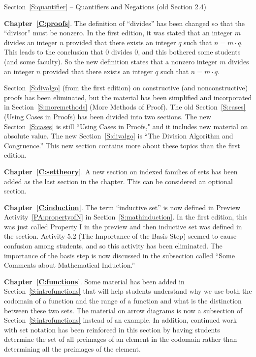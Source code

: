 Section~\ref{S:quantifier} -- Quantifiers and Negations (old Section 2.4)



\vskip6pt
\noindent
\textbf{Chapter~\ref{C:proofs}}.  The definition of ``divides'' has been changed so that the ``divisor'' must be nonzero.  In the first edition, it was stated that an integer $m$ divides an integer $n$ provided that there exists an integer $q$ such that $n = m \cdot q$.  This leads to the conclusion that $0$ divides $0$, and this bothered some students (and some faculty).  So the new definition states that a nonzero integer $m$ divides an integer $n$ provided that there exists an integer $q$ such that $n = m \cdot q$.

Section~\ref{S:divalgo} (from the first edition) on constructive (and nonconstructive) proofs has been eliminated, but the material has been simplified and incorporated in Section~\ref{S:moremethods} (More Methods of Proof).  The old Section~\ref{S:cases} (Using Cases in Proofs) has been divided into two sections.  The new Section~\ref{S:cases} is still ``Using Cases in Proofs," and it includes new material on absolute value.  The new Section~\ref{S:divalgo} is ``The Division Algorithm and Congruence.''  This new section contains more about these topics than the first edition.


\vskip6pt
\noindent
\textbf{Chapter~\ref{C:settheory}}.  A new section on indexed families of sets has been added as the last section in the chapter.  This can be considered an optional section.


\vskip6pt
\noindent
\textbf{Chapter~\ref{C:induction}}.  The term ``inductive set'' is now defined in Preview Activity~\ref{PA:propertyofN} in Section~\ref{S:mathinduction}.  In the first edition, this was just called Property I in the preview and then inductive set was defined in the section.  Activity 5.2 (The Importance of the Basis Step) seemed to cause confusion among students, and so this activity has been eliminated.  The importance of the basis step is now discussed in the subsection called ``Some Comments about Mathematical Induction.''


\vskip6pt
\noindent
\textbf{Chapter~\ref{C:functions}}. Some material has been added in 
Section~\ref{S:introfunctions} that will help students understand why we use both the codomain of a function and the range of a function and what is the distinction between these two sets.  The material on arrow diagrams is now a subsection of 
Section~\ref{S:introfunctions} instead of an example.  In addition, continued work with set notation has been reinforced in this section by having students determine the set of all preimages of an element in the codomain rather than determining all the preimages of the element.

